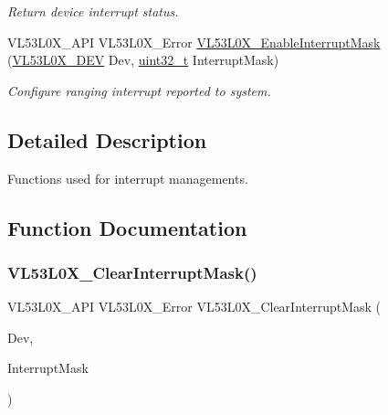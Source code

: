 \begin{DoxyCompactItemize}
\begin{DoxyCompactList}\small\item\em Return device interrupt status. \end{DoxyCompactList}\item 
V\+L53\+L0\+X\+\_\+\+A\+PI V\+L53\+L0\+X\+\_\+\+Error \hyperlink{group__VL53L0X__interrupt__group_ga882a69f683b24cb8102a5071ed0becf7}{V\+L53\+L0\+X\+\_\+\+Enable\+Interrupt\+Mask} (\hyperlink{group__VL53L0X__platform__group_ga2d6405308b1dd524b462f1b8fb97d167}{V\+L53\+L0\+X\+\_\+\+D\+EV} Dev, \hyperlink{vl53l0x__types_8h_a435d1572bf3f880d55459d9805097f62}{uint32\+\_\+t} Interrupt\+Mask)
\begin{DoxyCompactList}\small\item\em Configure ranging interrupt reported to system. \end{DoxyCompactList}\end{DoxyCompactItemize}


\subsection{Detailed Description}
Functions used for interrupt managements. 



\subsection{Function Documentation}
\mbox{\label{group__VL53L0X__interrupt__group_gaa84b2cf5cd87b118b9a43e7ae764447e}} 
\subsubsection{\texorpdfstring{V\+L53\+L0\+X\+\_\+\+Clear\+Interrupt\+Mask()}{VL53L0X\_ClearInterruptMask()}}
{\footnotesize\ttfamily V\+L53\+L0\+X\+\_\+\+A\+PI V\+L53\+L0\+X\+\_\+\+Error V\+L53\+L0\+X\+\_\+\+Clear\+Interrupt\+Mask (\begin{DoxyParamCaption}\item[{\hyperlink{group__VL53L0X__platform__group_ga2d6405308b1dd524b462f1b8fb97d167}{V\+L53\+L0\+X\+\_\+\+D\+EV}}]{Dev,  }\item[{\hyperlink{vl53l0x__types_8h_a435d1572bf3f880d55459d9805097f62}{uint32\+\_\+t}}]{Interrupt\+Mask }\end{DoxyParamCaption})}



